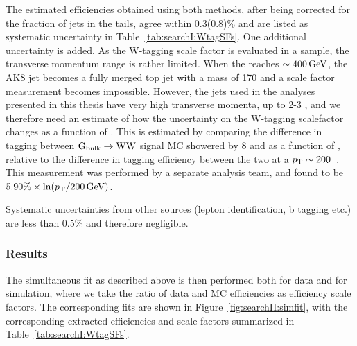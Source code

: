 The estimated efficiencies obtained using both methods, after being corrected for the fraction of \PW jets in the tails, agree within 0.3(0.8)\% and are listed as systematic uncertainty in Table~\ref{tab:searchI:WtagSFs}.\newline
One additional uncertainty is added. As the W-tagging scale factor is evaluated in a \ttbar sample, the transverse momentum range is rather limited. When the \PW \PT reaches $\sim 400 \,\text{Ge\hspace{-.08em}V}$, the AK8 jet becomes a fully merged top jet with a mass of 170 \GeV and a scale factor measurement becomes impossible. However, the jets used in the analyses presented in this thesis have very high transverse momenta, up to 2-3 \TeV, and we therefore need an estimate of how the uncertainty on the W-tagging scalefactor changes as a function of \PT. This is estimated by comparing the difference in tagging between $\mathrm{G}_\mathrm{bulk} \rightarrow \mathrm{W} \mathrm{W}$ signal MC showered by \PYTHIA{}8 and \HERWIG{++} as a function of \PT, relative to the difference in tagging efficiency between the two at a $p_{\mathrm{T}} \sim 200$~\GeV. This measurement was performed by a separate analysis team, and found to be $5.90\% \times \ln(p_{\mathrm{T}}/200\,\text{Ge\hspace{-.08em}V})$.


Systematic uncertainties from other sources (lepton identification, b tagging etc.) are less than 0.5\% and therefore negligible.

\subsubsection{Results}
The simultaneous fit as described above is then performed both for data and for simulation, where we take the ratio of data and MC efficiencies as efficiency scale factors.
The corresponding fits are shown in Figure~\ref{fig:searchII:simfit}, with the corresponding extracted efficiencies and scale factors summarized in Table~\ref{tab:searchI:WtagSFs}.

